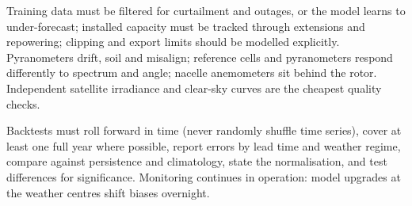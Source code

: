  Training data must be filtered for curtailment and outages, or the model learns to under-forecast; installed capacity must be tracked through extensions and repowering; clipping and export limits should be modelled explicitly. Pyranometers drift, soil and misalign; reference cells and pyranometers respond differently to spectrum and angle; nacelle anemometers sit behind the rotor. Independent satellite irradiance and clear-sky curves are the cheapest quality checks.

 Backtests must roll forward in time (never randomly shuffle time series), cover at least one full year where possible, report errors by lead time and weather regime, compare against persistence and climatology, state the normalisation, and test differences for significance. Monitoring continues in operation: model upgrades at the weather centres shift biases overnight.
